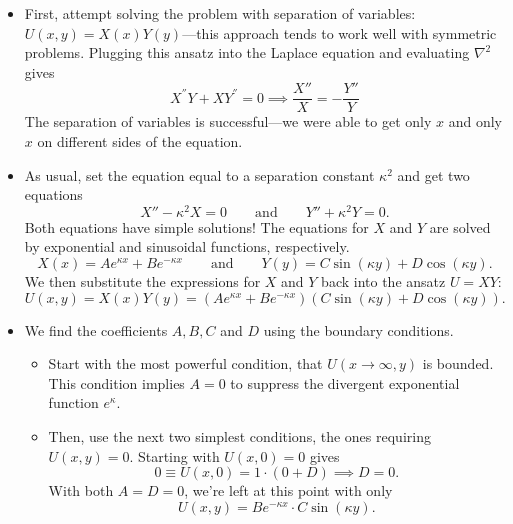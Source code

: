 \documentclass[11pt, a4paper]{article}
\newcommand{\eqtext}[1]{\qquad \text{#1} \qquad}
\renewcommand{\laplacian}{\nabla^{2}}
\begin{document}
\begin{itemize}
	\item First, attempt solving the problem with separation of variables: $ U(x, y) = X(x)Y(y) $---this approach tends to work well with symmetric problems. Plugging this ansatz into the Laplace equation and evaluating $ \laplacian $ gives
	\begin{equation*}
		X^{''}Y + XY^{''} = 0 \implies \frac{X''}{X} = - \frac{Y''}{Y}
	\end{equation*}
	The separation of variables is successful---we were able to get only $ x $ and only $ x $ on different sides of the equation. 
	
	\item As usual, set the equation equal to a separation constant $ \kappa^{2} $ and get two equations
	\begin{equation*}
		X'' - \kappa^{2}X = 0 \eqtext{and} Y'' + \kappa^{2} Y = 0.
	\end{equation*}
	Both equations have simple solutions! The equations for $ X $ and $ Y $ are solved by exponential and sinusoidal functions, respectively.
	\begin{equation*}
		X(x) = Ae^{\kappa x} + Be^{-\kappa x} \eqtext{and} Y(y) = C\sin(\kappa y) + D\cos (\kappa y).
	\end{equation*}
	We then substitute the expressions for $ X $ and $ Y $ back into the ansatz $ U = XY $:
	\begin{equation*}
		U(x, y)  = X(x)Y(y) = \left(Ae^{\kappa x} + Be^{-\kappa x}\right)\left(C\sin(\kappa y) + D\cos (\kappa y)\right).
	\end{equation*}
	
	
	\item We find the coefficients $ A, B, C $ and $ D $ using the boundary conditions. 
	\begin{itemize}
		\item Start with the most powerful condition, that $ U(x \to \infty, y) $ is bounded. This condition implies $ A = 0 $ to suppress the divergent exponential function $ e^{\kappa } $. 
			
		\item Then, use the next two simplest conditions, the ones requiring $ U(x, y) = 0 $. Starting with $ U(x, 0) = 0 $ gives
		\begin{equation*}
			0 \equiv U(x, 0) = 1 \cdot (0 + D) \implies D = 0.
		\end{equation*}
		With both $ A = D = 0 $, we're left at this point with only 
		\begin{equation*}
			U(x, y) = Be^{-\kappa x} \cdot C \sin (\kappa y).
		\end{equation*}
		

\end{itemize}
\end{itemize}
\end{document}
